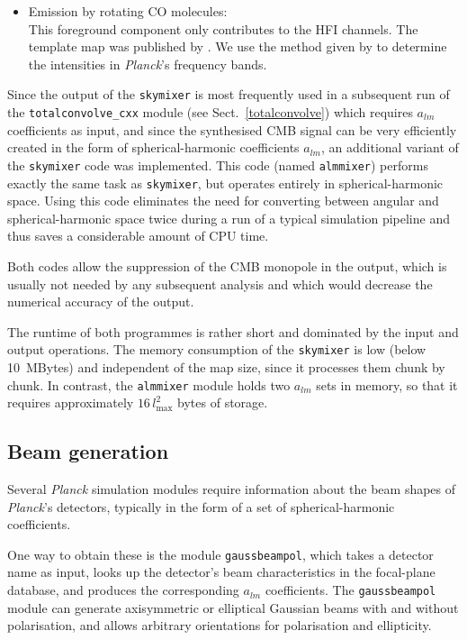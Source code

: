 \documentclass{aa}
\begin{document}
\begin{itemize}
  \item Emission by rotating CO molecules:\\ This foreground component
    only contributes to the HFI channels. The template map was
    published by \cite{dame-etal-1996,dame-etal-2001}. We use the
    method given by \cite{schaefer-etal-2004b} to determine the
    intensities in \emph{Planck}'s frequency bands.

\end{itemize}

Since the output of the {\tt skymixer} is most frequently used in a
subsequent run of the {\tt totalconvolve\_cxx} module (see
Sect.~\ref{totalconvolve}) which requires $a_{lm}$ coefficients as input,
and since the synthesised CMB signal can be very efficiently created
in the form of spherical-harmonic coefficients $a_{lm}$, an additional
variant of the {\tt skymixer} code was implemented. This code (named
{\tt almmixer}) performs exactly the same task as {\tt skymixer}, but
operates entirely in spherical-harmonic space. Using this code
eliminates the need for converting between angular and
spherical-harmonic space twice during a run of a typical simulation
pipeline and thus saves a considerable amount of CPU time.

Both codes allow the suppression of the CMB monopole in the output,
which is usually not needed by any subsequent analysis and
which would decrease the numerical accuracy of the output.

The runtime of both programmes is rather short and dominated by the
input and output operations. The memory consumption
of the {\tt skymixer} is low (below 10~MBytes) and independent of the
map size, since it processes them chunk by chunk. In contrast, the
{\tt almmixer} module holds two $a_{lm}$ sets in memory, so that it
requires approximately $16\,l_{\text{max}}^2$ bytes of storage.

\subsection {Beam generation}
\label{beam}

Several \emph{Planck} simulation modules require information about the
beam shapes of \emph{Planck}'s detectors, typically in the form of a
set of spherical-harmonic coefficients.

One way to obtain these is the module {\tt gaussbeampol}, which takes
a detector name as input, looks up the detector's beam characteristics
in the focal-plane database, and produces the corresponding $a_{lm}$
coefficients. The {\tt gaussbeampol} module can generate axisymmetric
or elliptical Gaussian beams with and without polarisation, and allows
arbitrary orientations for polarisation and ellipticity.
\end{document}
